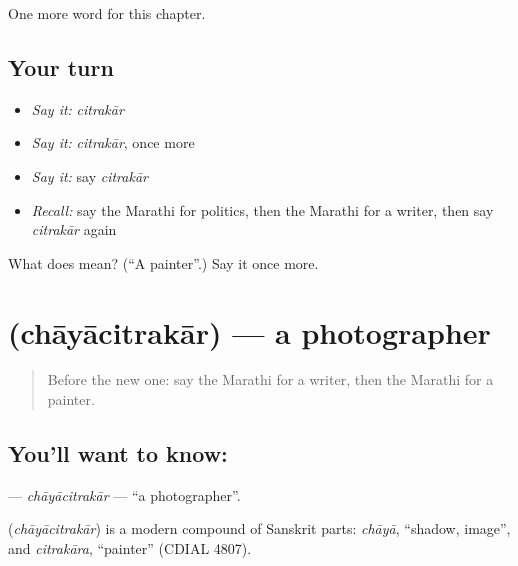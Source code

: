 \begin{grammarlens}[title={What you've built}]
One more word for this chapter.
\end{grammarlens}

\subsection*{Your turn}
\begin{itemize}
\raggedright
  \item \emph{Say it:} \emph{citrakār}
  \item \emph{Say it:} \emph{citrakār}, once more
  \item \emph{Say it:} say \emph{citrakār}
  \item \emph{Recall:} say the Marathi for politics, then the Marathi for a writer, then say \emph{citrakār} again
\end{itemize}

\begin{tcolorbox}[breakable,colback=teal!4,colframe=teal!35!black,title={Before you move on}]
What does  mean? (\textquotedblleft{}A painter\textquotedblright{}.) Say it once more.
\end{tcolorbox}
\section[\texorpdfstring{\mr{छायाचित्रकार} (chāyācitrakār)}{छायाचित्रकार (chāyācitrakār)}]{ (chāyācitrakār) — a photographer}

\label{lesson:MR-C180-chayacitrakar}



\begin{quote}
Before the new one: say the Marathi for a writer, then the Marathi for a painter.
\end{quote}

\subsection*{You'll want to know: }
\textbf{} — \emph{chāyācitrakār} — \textquotedblleft{}a photographer\textquotedblright{}.

\begin{cousinweb}
\textbf{} (\emph{chāyācitrakār}) is a modern compound of Sanskrit parts: \emph{chāyā}, \textquotedblleft{}shadow, image\textquotedblright{}, and \emph{citrakāra}, \textquotedblleft{}painter\textquotedblright{} (CDIAL 4807).
\end{cousinweb}

